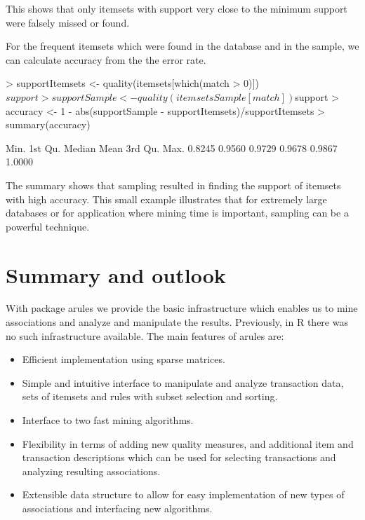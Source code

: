 \documentclass[10pt,a4paper]{article}
\newcommand{\strong}[1]{{\normalfont\fontseries{b}\selectfont #1}}
\newcommand{\pkg}[1]{\strong{#1}}
\newcommand{\proglang}[1]{\textsf{#1}}
\begin{document}
This shows that only itemsets with support very close to the minimum support
were falsely missed or found.

For the frequent itemsets which were found in the database and in the
sample, we can calculate accuracy from the the error rate.

\begin{Schunk}
\begin{Sinput}
> supportItemsets <- quality(itemsets[which(match > 0)])$support
> supportSample <- quality(itemsetsSample[match])$support
> accuracy <- 1 - abs(supportSample - supportItemsets)/supportItemsets
> summary(accuracy)
\end{Sinput}
\begin{Soutput}
   Min. 1st Qu.  Median    Mean 3rd Qu.    Max. 
 0.8245  0.9560  0.9729  0.9678  0.9867  1.0000 
\end{Soutput}
\end{Schunk}

The summary shows that sampling resulted in finding the support of itemsets
with high accuracy. This small example illustrates 
that for extremely large databases or for application where mining time 
is important, sampling can be a powerful technique.



\section{Summary and outlook\label{sec:conclusion}}

With package \pkg{arules} we
provide the basic infrastructure which enables us to 
mine associations and analyze and manipulate the results. 
Previously, in \proglang{R} there was no such infrastructure available.
The main features of \pkg{arules} are:

\begin{itemize}
 \item Efficient implementation using sparse matrices.
 \item Simple and intuitive interface to manipulate and analyze
  transaction data, sets of itemsets and rules with subset selection and
  sorting.
 \item Interface to two fast mining algorithms.
 \item Flexibility in terms of adding new quality measures, and
  additional item and transaction descriptions which can be used for
  selecting transactions and analyzing resulting associations.
 \item Extensible data structure to allow for easy implementation of new
  types of associations and interfacing new algorithms.
\end{itemize}
\end{document}
